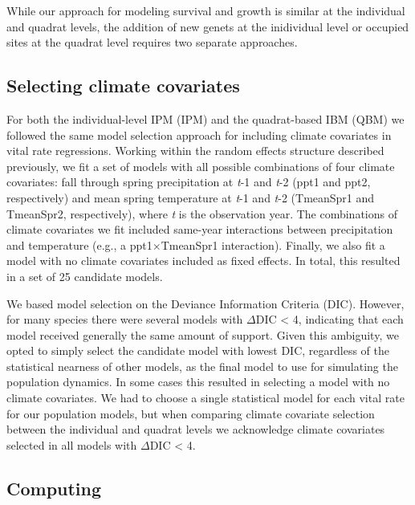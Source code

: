 \documentclass[12pt]{article}
\begin{document}
While our approach for modeling survival and growth is similar at the individual and quadrat levels, the addition of new genets at the inidividual level or occupied sites at the quadrat level requires two separate approaches.

\subsection{Selecting climate covariates}
For both the individual-level IPM (IPM) and the quadrat-based IBM (QBM) we followed the same model selection approach for including climate covariates in vital rate regressions.  Working within the random effects structure described previously, we fit a set of models with all possible combinations of four climate covariates: fall through spring precipitation at \emph{t}-1 and \emph{t}-2 (ppt1 and ppt2, respectively) and mean spring temperature at \emph{t}-1 and \emph{t}-2 (TmeanSpr1 and TmeanSpr2, respectively), where \emph{t} is the observation year. The combinations of climate covariates we fit included same-year interactions between precipitation and temperature (e.g., a ppt1$\times$TmeanSpr1 interaction). Finally, we also fit a model with no climate covariates included as fixed effects. In total, this resulted in a set of 25 candidate models. 

We based model selection on the Deviance Information Criteria (DIC). However, for many species there were several models with $\Delta$DIC < 4, indicating that each model received generally the same amount of support. Given this ambiguity, we opted to simply select the candidate model with lowest DIC, regardless of the statistical nearness of other models, as the final model to use for simulating the population dynamics. In some cases this resulted in selecting a model with no climate covariates. We had to choose a single statistical model for each vital rate for our population models, but when comparing climate covariate selection between the individual and quadrat levels we acknowledge climate covariates selected in all models with $\Delta$DIC < 4.

\subsection{Computing}
\end{document}
